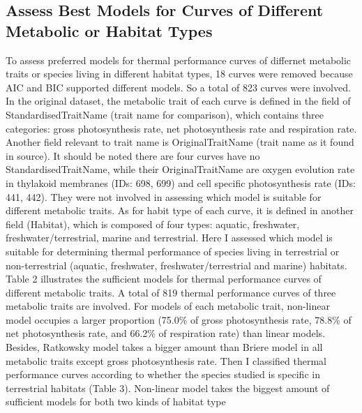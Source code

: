 \documentclass[11pt]{article}
\begin{document}
        \subsection{Assess Best Models for Curves of Different Metabolic or Habitat Types}
        To assess preferred models for thermal performance curves of differnet metabolic traits or species living in different 
        habitat types, 18 curves were removed because AIC and BIC supported different models. So a total of 823 
        curves were involved.
        \newline  
        In the original dataset, the metabolic trait of each curve is defined in the field of StandardisedTraitName 
        (trait name for comparison), 
        which contains three categories: gross photosynthesis rate, net photosynthesis rate and respiration rate. Another field 
        relevant to 
        trait name is OriginalTraitName (trait name as it found in source). It should be noted there are four curves 
        have no StandardisedTraitName, while their OriginalTraitName are oxygen evolution 
        rate in thylakoid membranes (IDs: 698, 699) and cell specific photosynthesis rate (IDs: 441, 442). They were not 
        involved in assessing which model is suitable for different metabolic traits.
        As for habit type of each curve, it is defined in another field (Habitat), which is composed of four types: aquatic, 
        freshwater, freshwater/terrestrial, marine and terrestrial. Here I assessed which model is suitable for determining 
        thermal performance of species living in terrestrial or non-terrestrial (aquatic, 
        freshwater, freshwater/terrestrial and marine) habitats.
        \newline  
        Table 2 illustrates the sufficient models for thermal performance curves of different metabolic traits. 
        A total of 819 thermal performance curves of three metabolic traits are involved. 
        For models of each metabolic trait, non-linear  
        model occupies a larger proportion 
        (75.0\% of gross photosynthesis rate, 78.8\% of net photosynthesis rate, and 66.2\% of respiration rate) than linear 
        models. Besides, Ratkowsky model takes a bigger amount than Briere model in all metabolic traits except gross 
        photosynthesis rate.
        \newline
        Then I classified thermal performance curves according to whether the species studied is specific in terrestrial 
        habitats (Table 3). Non-linear model 
        takes the biggest amount of sufficient models for both two kinds of habitat type 
\end{document}
